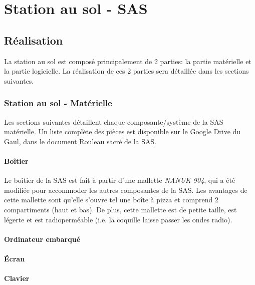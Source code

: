 \chapter{Station au sol - SAS}
\label{chap:sas}

\section{Réalisation}

La station au sol est composé principalement de 2 parties: la partie matérielle
et la partie logicielle. La réalisation de ces 2 parties sera détaillée dans
les sections suivantes.

\subsection{Station au sol - Matérielle}

Les sections suivantes détaillent chaque composante/système de la SAS
matérielle. Un liste complète des pièces est disponible sur le Google Drive du
Gaul, dans le document \href{https://drive.google.com/open?id=1WfV-Swc37Ih476rmRLYdwrBWRaUo8ZzXshS-LzYTQF4}{Rouleau sacré de la SAS}.

\subsubsection{Boîtier}

Le boîtier de la SAS est fait à partir d'une mallette \textit{NANUK 904}, qui a
été modifiée pour accommoder les autres composantes de la SAS. Les avantages de
cette mallette sont qu'elle s'ouvre tel une boîte à pizza et comprend 2
compartiments (haut et bas). De plus, cette mallette est de petite taille, est
légerte et est radioperméable (i.e. la coquille laisse passer les ondes radio).

\subsubsection{Ordinateur embarqué}



\subsubsection{Écran}



\subsubsection{Clavier}



